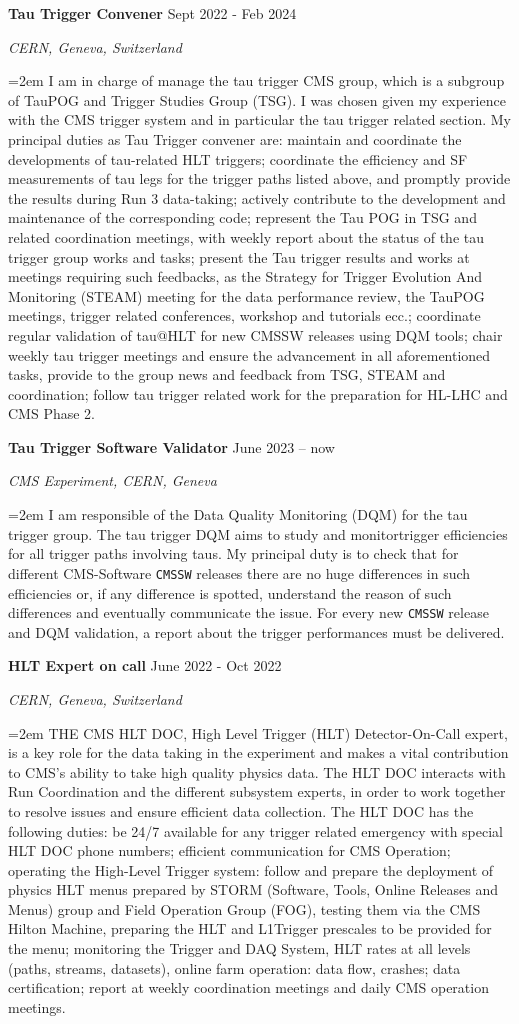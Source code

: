\documentclass[paper=a4,fontsize=12pt]{article} %
\newcommand{\sepspace}{\vspace*{1em}}		%
\newcommand{\EducationEntry}[4]{
	\noindent \textbf{#1} \hfill      %
	{#2} \par  %
	\noindent \textit{#3} \par        %
	\noindent\hangindent=2em\hangafter=0 \small #4 %
	\normalsize \par}
\begin{document}
	\sepspace 
	\EducationEntry{Tau Trigger Convener}{Sept 2022 - Feb 2024}{CERN, Geneva, Switzerland}{
	I am in charge of manage the tau trigger CMS group, which is a subgroup of TauPOG and Trigger Studies Group (TSG). I was chosen given my experience with the CMS trigger system and in particular the tau trigger related section. My principal duties as Tau Trigger convener are: maintain and coordinate the developments of tau-related HLT triggers; coordinate the efficiency and SF measurements of tau legs for the trigger paths listed above, and promptly provide the results during Run 3 data-taking; actively contribute to the development and maintenance of the corresponding code; represent the Tau POG in TSG and related coordination meetings, with weekly report about the status of the tau trigger group works and tasks; present the Tau trigger results and works at meetings requiring such feedbacks, as the Strategy for Trigger Evolution And Monitoring (STEAM) meeting for the data performance review, the TauPOG meetings, trigger related conferences, workshop and tutorials ecc.; coordinate regular validation of tau@HLT for new CMSSW releases using DQM tools; chair weekly tau trigger meetings and ensure the advancement in all aforementioned tasks, provide to the group news and feedback from TSG, STEAM and coordination; follow tau trigger related work for the preparation for HL-LHC and CMS Phase 2.
}
	\sepspace 
    \EducationEntry{Tau Trigger Software Validator}{June 2023 -- now}{CMS Experiment, CERN, Geneva}{I am responsible of the Data Quality Monitoring (DQM) for the tau trigger group. The tau trigger DQM aims to study and monitortrigger efficiencies for all trigger paths involving taus. My principal duty is to check that for different CMS-Software \texttt{CMSSW} releases there are no huge differences in such efficiencies or, if any difference is spotted, understand the reason of such differences and eventually communicate the issue. For every new \texttt{CMSSW} release and DQM validation, a report about the trigger performances must be delivered.}
    \sepspace
	\EducationEntry{HLT Expert on call}{June 2022 - Oct 2022}{CERN, Geneva, Switzerland}{
	THE CMS HLT DOC, High Level Trigger (HLT) Detector-On-Call expert, is a key role for the data taking in the experiment and makes a vital contribution to CMS's ability to take high quality physics data. The HLT DOC interacts with Run Coordination and the different subsystem experts, in order to work together to resolve issues and ensure efficient data collection. The HLT DOC has the following duties: be 24/7 available for any trigger related emergency with special HLT DOC phone numbers; efficient communication for CMS Operation; operating the High-Level Trigger system: follow and prepare the deployment of physics HLT menus prepared by STORM (Software, Tools, Online Releases and Menus) group and Field Operation Group (FOG), testing them via the CMS Hilton Machine, preparing the HLT and L1Trigger prescales to be provided for the menu; monitoring the Trigger and DAQ System, HLT rates at all levels (paths, streams, datasets), online farm operation: data flow, crashes; data certification; report at weekly coordination meetings and daily CMS operation meetings.\\}
\end{document}
